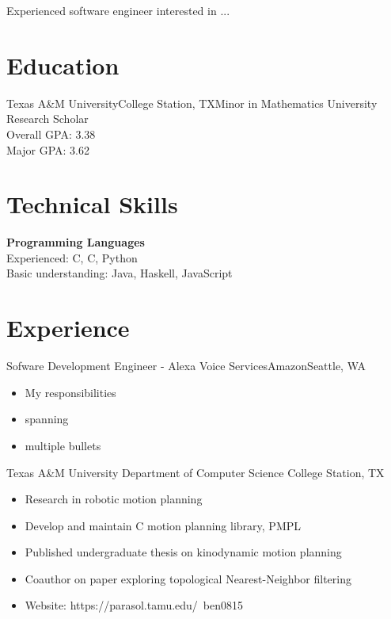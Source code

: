 \documentclass[11pt,a4paper,sans]{moderncv}
\newcommand{\Rplus}{\protect\hspace{-.1em}\protect\raisebox{.35ex}{\smaller{\smaller\textbf{+}}}}
\newcommand{\Cpp}{\mbox{C\Rplus\Rplus}\xspace}
\newcommand{\spacing}{4pt}
\begin{document}
\makecvtitle

\addvspace{-2em}

\small{Experienced software engineer interested in ...}

\section{Education}

\vspace{\spacing}

    {Texas A\&M University}{College Station, TX}{Minor in Mathematics}
    {University Research Scholar \\ Overall GPA: 3.38 \\ Major GPA: 3.62}

\section{Technical Skills}

\vspace{\spacing}

\textbf{Programming Languages} \\
  Experienced: \Cpp, C, Python \\
  Basic understanding: Java, Haskell, JavaScript

\section{Experience}

\vspace{\spacing}

  {Sofware Development Engineer - Alexa Voice Services}{Amazon}{Seattle, WA}{}
    {\vspace{3pt}
    \begin{itemize}
      \setlength{\itemindent}{1em}
      \item My responsibilities
      \item spanning
      \item multiple bullets
    \end{itemize}
    }

\vspace{\spacing}

  {Texas A\&M University Department of Computer Science}
    {College Station, TX}{}{\vspace{3pt}
    \begin{itemize}
      \setlength{\itemindent}{1em}
      \item Research in robotic motion planning
      \item Develop and maintain \Cpp motion planning library, PMPL
      \item Published undergraduate thesis on kinodynamic motion planning
      \item Coauthor on paper exploring topological Nearest-Neighbor filtering
      \item Website: https://parasol.tamu.edu/~ben0815
    \end{itemize}
    }
\end{document}
